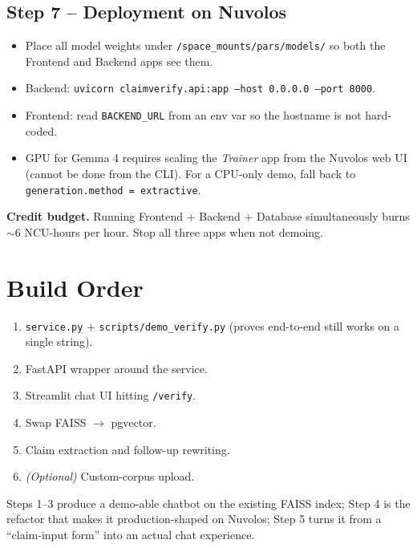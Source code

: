 \documentclass[11pt,a4paper]{article}
\begin{document}
\subsection{Step 7 -- Deployment on Nuvolos}

\begin{itemize}
  \item Place all model weights under \texttt{/space\_mounts/pars/models/}
        so both the Frontend and Backend apps see them.
  \item Backend: \texttt{uvicorn claimverify.api:app --host 0.0.0.0
        --port 8000}.
  \item Frontend: read \texttt{BACKEND\_URL} from an env var so the
        hostname is not hard-coded.
  \item GPU for Gemma 4 requires scaling the \textit{Trainer} app from
        the Nuvolos web UI (cannot be done from the CLI). For a
        CPU-only demo, fall back to
        \texttt{generation.method\,=\,extractive}.
\end{itemize}

\begin{notebox}
\textbf{Credit budget.} Running Frontend + Backend + Database
simultaneously burns $\sim$6 NCU-hours per hour. Stop all three apps
when not demoing.
\end{notebox}

\section{Build Order}

\begin{enumerate}
  \item \texttt{service.py} + \texttt{scripts/demo\_verify.py}
        (proves end-to-end still works on a single string).
  \item FastAPI wrapper around the service.
  \item Streamlit chat UI hitting \texttt{/verify}.
  \item Swap FAISS $\to$ pgvector.
  \item Claim extraction and follow-up rewriting.
  \item \textit{(Optional)} Custom-corpus upload.
\end{enumerate}

Steps 1--3 produce a demo-able chatbot on the existing FAISS index;
Step 4 is the refactor that makes it production-shaped on Nuvolos;
Step 5 turns it from a ``claim-input form'' into an actual chat
experience.
\end{document}
